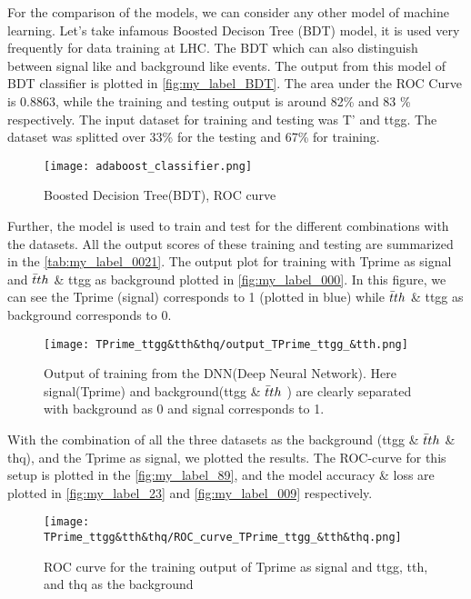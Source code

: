 For the comparison of the models, we can consider any other model of machine learning. Let's take infamous Boosted Decison Tree (BDT) model, it is used very frequently for data training at LHC. 
The BDT which can also distinguish between signal like and background like events. The output from this model of BDT classifier is plotted in \autoref{fig:my_label_BDT}. The area under the ROC Curve is 0.8863, while the training and testing output is around 82\% and 83 \% respectively. The input dataset for training and testing was T' and ttgg. The dataset was splitted over 33\% for the testing and 67\% for training. 


\begin{figure}[H]
    \centering
    \texttt{[image: adaboost\_classifier.png]}
    \caption{Boosted Decision Tree(BDT), ROC curve  }
    \label{fig:my_label_BDT}
\end{figure}


 
 Further, the model is used to train and test for the different combinations with the datasets. All the output scores of these training and testing are summarized in the \autoref{tab:my_label_0021}. The output plot for training with Tprime as signal and $\Bar{t}th$ \& ttgg as background plotted in \autoref{fig:my_label_000}. In this figure, we can see the Tprime (signal) corresponds to 1 (plotted in blue) while $\Bar{t}th$ \& ttgg as background corresponds to 0.
  
  \begin{figure}[H]
     \centering
\texttt{[image: TPrime\_ttgg\&tth\&thq/output\_TPrime\_ttgg\_\&tth.png]}
     \caption{Output of training from the DNN(Deep Neural Network). Here signal(Tprime) and background(ttgg  \& $\Bar{t}th$ ) are clearly separated with background as 0 and signal corresponds to 1. }
     \label{fig:my_label_000}
 \end{figure}
 
 
 With the combination of all the three datasets as the background (ttgg  \& $\Bar{t}th$ \& thq), and the Tprime as signal, we plotted the results. The ROC-curve for this setup is plotted in the \autoref{fig:my_label_89}, and the model accuracy \& loss are plotted in \autoref{fig:my_label_23} and \autoref{fig:my_label_009} respectively.
 
\begin{figure}[H]
    \centering
    \texttt{[image: TPrime\_ttgg\&tth\&thq/ROC\_curve\_TPrime\_ttgg\_\&tth\&thq.png]}
    \caption{ROC curve for the training output of Tprime as signal and ttgg, tth, and thq as the background}
    \label{fig:my_label_89}
\end{figure}

